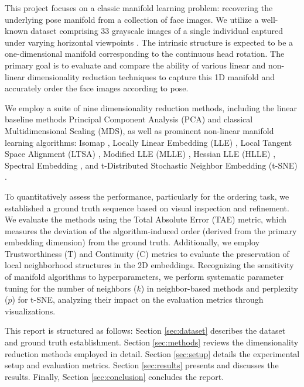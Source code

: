 \documentclass{article}
\begin{document}
This project focuses on a classic manifold learning problem: recovering the underlying pose manifold from a collection of face images. We utilize a well-known dataset comprising 33 grayscale images of a single individual captured under varying horizontal viewpoints \citep{Tenenbaum2000}. The intrinsic structure is expected to be a one-dimensional manifold corresponding to the continuous head rotation. The primary goal is to evaluate and compare the ability of various linear and non-linear dimensionality reduction techniques to capture this 1D manifold and accurately order the face images according to pose.

We employ a suite of nine dimensionality reduction methods, including the linear baseline methods Principal Component Analysis (PCA) and classical Multidimensional Scaling (MDS), as well as prominent non-linear manifold learning algorithms: Isomap \citep{Tenenbaum2000}, Locally Linear Embedding (LLE) \citep{Roweis2000}, Local Tangent Space Alignment (LTSA) \citep{Zhang2004}, Modified LLE (MLLE) \citep{Zhang2007}, Hessian LLE (HLLE) \citep{Donoho2003}, Spectral Embedding \citep{Belkin2003}, and t-Distributed Stochastic Neighbor Embedding (t-SNE) \citep{vanDerMaaten2008}.

To quantitatively assess the performance, particularly for the ordering task, we established a ground truth sequence based on visual inspection and refinement. We evaluate the methods using the Total Absolute Error (TAE) metric, which measures the deviation of the algorithm-induced order (derived from the primary embedding dimension) from the ground truth. Additionally, we employ Trustworthiness (T) and Continuity (C) metrics \citep{Venna2001} to evaluate the preservation of local neighborhood structures in the 2D embeddings. Recognizing the sensitivity of manifold algorithms to hyperparameters, we perform systematic parameter tuning for the number of neighbors ($k$) in neighbor-based methods and perplexity ($p$) for t-SNE, analyzing their impact on the evaluation metrics through visualizations.

This report is structured as follows: Section \ref{sec:dataset} describes the dataset and ground truth establishment. Section \ref{sec:methods} reviews the dimensionality reduction methods employed in detail. Section \ref{sec:setup} details the experimental setup and evaluation metrics. Section \ref{sec:results} presents and discusses the results. Finally, Section \ref{sec:conclusion} concludes the report.

\end{document}
